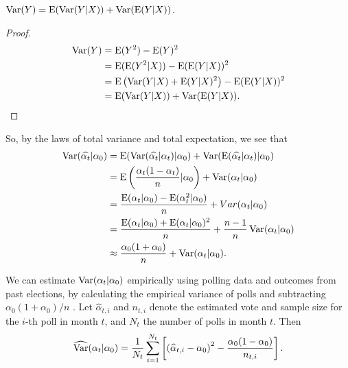 \documentclass[thesis.tex]{subfiles}
\begin{document}
\begin{lemma*}
\(\operatorname{Var}(Y) = \operatorname{E}(\operatorname{Var}(Y | X)) + \operatorname{Var}(\operatorname{E}(Y | X))\).
\end{lemma*}
\begin{proof}\begin{equation*}
\begin{aligned}
	\operatorname{Var}(Y) &= \operatorname{E}(Y^2) - \operatorname{E}(Y)^2 \\
	&= \operatorname{E}(\operatorname{E}(Y^2 | X)) - \operatorname{E}(\operatorname{E}(Y | X))^2 \\
	&= \operatorname{E}\left(\operatorname{Var}(Y|X) + \operatorname{E}(Y | X)^2\right) - \operatorname{E}(\operatorname{E}(Y | X))^2 \\
	&= \operatorname{E}(\operatorname{Var}(Y | X)) + \operatorname{Var}(\operatorname{E}(Y | X)).
\end{aligned}
\end{equation*}
\end{proof}

So, by the laws of total variance and total expectation, we see that \begin{equation*}\begin{aligned}
	\operatorname{Var}(\widehat{\alpha_t} | \alpha_0)
	&= \operatorname{E}(\operatorname{Var}(\widehat{\alpha_t} | \alpha_t) | \alpha_0) + \operatorname{Var}(\operatorname{E}(\widehat{\alpha_t} | \alpha_t) | \alpha_0) \\
	&= \operatorname{E}\left(\frac{\alpha_t(1- \alpha_t)}{n} | \alpha_0\right) + \operatorname{Var}(\alpha_t | \alpha_0) \\
	&= \frac{\operatorname{E}(\alpha_t | \alpha_0) - \operatorname{E}(\alpha_t^2 | \alpha_0)}{n} + Var(\alpha_t | \alpha_0) \\
	&= \frac{\operatorname{E}(\alpha_t | \alpha_0) + \operatorname{E}(\alpha_t | \alpha_0)^2}{n} + \frac{n-1}{n}\operatorname{Var}(\alpha_t | \alpha_0) \\
	&\approx \frac{\alpha_0 (1 + \alpha_0)}{n} + \operatorname{Var}(\alpha_t | \alpha_0).
\end{aligned}
\end{equation*}

We can estimate \(\operatorname{Var}(\alpha_t | \alpha_0)\) empirically using polling data and outcomes from past elections, by calculating the empirical variance of polls and subtracting \(\alpha_0 (1 + \alpha_0) / n\) . Let \(\widehat{\alpha}_{t, i}\) and \(n_{t, i}\) denote the estimated vote and sample size for the \(i\)-th poll in month \(t\), and \(N_t\) the number of polls in month \(t\). Then \begin{equation*}
\begin{aligned}
\widehat{\operatorname{Var}}(\alpha_t | \alpha_0) = \frac{1}{N_t} \sum_{i=1}^{N_t}\left[ \left( \widehat{\alpha}_{t, i} - \alpha_0\right)^2 - \frac{\alpha_0 (1 - \alpha_0)}{n_{t,i}} \right].
\end{aligned}
\end{equation*}
\end{document}
